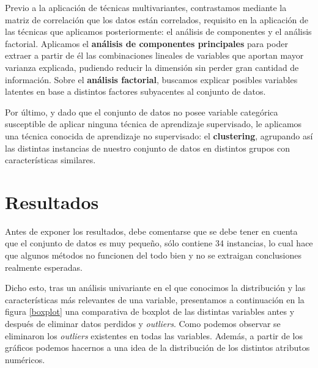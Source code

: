\documentclass[letterpaper,11pt]{article}
\begin{document}
Previo a la aplicación de técnicas multivariantes, contrastamos mediante la matriz de correlación que los datos están correlados, requisito en la aplicación de las técnicas que aplicamos posteriormente: el análisis de componentes y el análisis factorial. Aplicamos el \textbf{análisis de componentes principales} para poder extraer a partir de él las combinaciones lineales de variables que aportan mayor varianza explicada, pudiendo reducir la dimensión sin perder gran cantidad de información. Sobre el \textbf{análisis factorial}, buscamos explicar posibles variables latentes en base a distintos factores subyacentes al conjunto de datos.

Por último, y dado que el conjunto de datos no posee variable categórica susceptible de aplicar ninguna técnica de aprendizaje supervisado, le aplicamos una técnica conocida de aprendizaje no supervisado: el \textbf{clustering}, agrupando así las distintas instancias de nuestro conjunto de datos en distintos grupos con características similares.

\section{Resultados}

Antes de exponer los resultados, debe comentarse que se debe tener en cuenta que el conjunto de datos es muy pequeño, sólo contiene 34 instancias, lo cual hace que algunos métodos no funcionen del todo bien y no se extraigan conclusiones realmente esperadas.

Dicho esto, tras un análisis univariante en el que conocimos la distribución y las características más relevantes de una variable, presentamos a continuación en la figura \ref{boxplot} una comparativa de boxplot de las distintas variables antes y después de eliminar datos perdidos y \textit{outliers}. Como podemos observar se eliminaron los \textit{outliers} existentes en todas las variables. Además, a partir de los gráficos podemos hacernos a una idea de la distribución de los distintos atributos numéricos.
\end{document}
